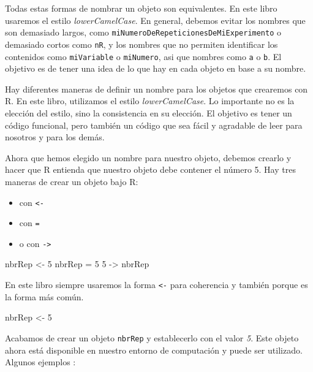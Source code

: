 \documentclass[
]{book}
\newenvironment{Shaded}{\begin{snugshade}}{\end{snugshade}}
\newcommand{\DecValTok}[1]{\textcolor[rgb]{0.00,0.00,0.81}{#1}}
\newcommand{\NormalTok}[1]{#1}
\newcommand{\StringTok}[1]{\textcolor[rgb]{0.31,0.60,0.02}{#1}}
\providecommand{\tightlist}{%
  \setlength{\itemsep}{0pt}\setlength{\parskip}{0pt}}
\begin{document}
Todas estas formas de nombrar un objeto son equivalentes. En este libro usaremos el estilo \emph{lowerCamelCase}. En general, debemos evitar los nombres que son demasiado largos, como \texttt{miNumeroDeRepeticionesDeMiExperimento} o demasiado cortos como \texttt{nR}, y los nombres que no permiten identificar los contenidos como \texttt{miVariable} o \texttt{miNumero}, asi que nombres como \texttt{a} o \texttt{b}. El objetivo es de tener una idea de lo que hay en cada objeto en base a su nombre.

Hay diferentes maneras de definir un nombre para los objetos que crearemos con R. En este libro, utilizamos el estilo \emph{lowerCamelCase}. Lo importante no es la elección del estilo, sino la consistencia en su elección. El objetivo es tener un código funcional, pero también un código que sea fácil y agradable de leer para nosotros y para los demás.

Ahora que hemos elegido un nombre para nuestro objeto, debemos crearlo y hacer que R entienda que nuestro objeto debe contener el número 5. Hay tres maneras de crear un objeto bajo R:

\begin{itemize}
\tightlist
\item
  con \texttt{\textless{}-}
\item
  con \texttt{=}
\item
  o con \texttt{-\textgreater{}}
\end{itemize}

\begin{Shaded}
\begin{Highlighting}[]
\NormalTok{nbrRep <-}\StringTok{ }\DecValTok{5}
\NormalTok{nbrRep =}\StringTok{ }\DecValTok{5}
\DecValTok{5}\NormalTok{ ->}\StringTok{ }\NormalTok{nbrRep}
\end{Highlighting}
\end{Shaded}

En este libro siempre usaremos la forma \texttt{\textless{}-} para coherencia y también porque es la forma más común.

\begin{Shaded}
\begin{Highlighting}[]
\NormalTok{nbrRep <-}\StringTok{ }\DecValTok{5}
\end{Highlighting}
\end{Shaded}

Acabamos de crear un objeto \texttt{nbrRep} y establecerlo con el valor \emph{5}. Este objeto ahora está disponible en nuestro entorno de computación y puede ser utilizado. Algunos ejemplos :
\end{document}

